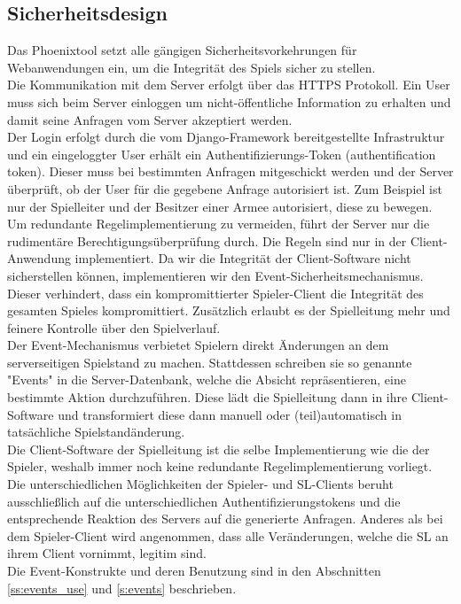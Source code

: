 \documentclass[11pt,a4paper,twocolumn]{article}
\begin{document}
\subsection{Sicherheitsdesign}\label{ss:securityconcept}
Das Phoenixtool setzt alle gängigen Sicherheitsvorkehrungen für Webanwendungen ein, um die Integrität des Spiels sicher zu stellen.\\
Die Kommunikation mit dem Server erfolgt über das HTTPS Protokoll. Ein User muss sich beim Server einloggen um nicht-öffentliche Information zu erhalten und damit seine Anfragen vom Server akzeptiert werden.\\
Der Login erfolgt durch die vom Django-Framework bereitgestellte Infrastruktur und ein eingeloggter User erhält ein Authentifizierungs-Token (authentification token). Dieser muss bei bestimmten Anfragen mitgeschickt werden und der Server überprüft, ob der User für die gegebene Anfrage autorisiert ist. Zum Beispiel ist nur der Spielleiter und der Besitzer einer Armee autorisiert, diese zu bewegen.\\
Um redundante Regelimplementierung zu vermeiden, führt der Server nur die rudimentäre Berechtigungsüberprüfung durch. Die Regeln sind nur in der Client-Anwendung implementiert. Da wir die Integrität der Client-Software nicht sicherstellen können, implementieren wir den Event-Sicherheitsmechanismus. Dieser verhindert, dass ein kompromittierter Spieler-Client die Integrität des gesamten Spieles kompromittiert. Zusätzlich erlaubt es der Spielleitung mehr und feinere Kontrolle über den Spielverlauf.\\
Der Event-Mechanismus verbietet Spielern direkt Änderungen an dem serverseitigen Spielstand zu machen. Stattdessen schreiben sie so genannte "Events" in die Server-Datenbank, welche die Absicht repräsentieren, eine bestimmte Aktion durchzuführen. Diese lädt die Spielleitung dann in ihre Client-Software und transformiert diese dann manuell oder (teil)automatisch in tatsächliche Spielstandänderung.\\
Die Client-Software der Spielleitung ist die selbe Implementierung wie die der Spieler, weshalb immer noch keine redundante Regelimplementierung vorliegt. Die unterschiedlichen Möglichkeiten der Spieler- und SL-Clients beruht ausschließlich auf die unterschiedlichen Authentifizierungstokens und die entsprechende Reaktion des Servers auf die generierte Anfragen. Anderes als bei dem Spieler-Client wird angenommen, dass alle Veränderungen, welche die SL an ihrem Client vornimmt, legitim sind.\\
Die Event-Konstrukte und deren Benutzung sind in den Abschnitten \ref{ss:events_use} und \ref{s:events} beschrieben. 
\end{document}
